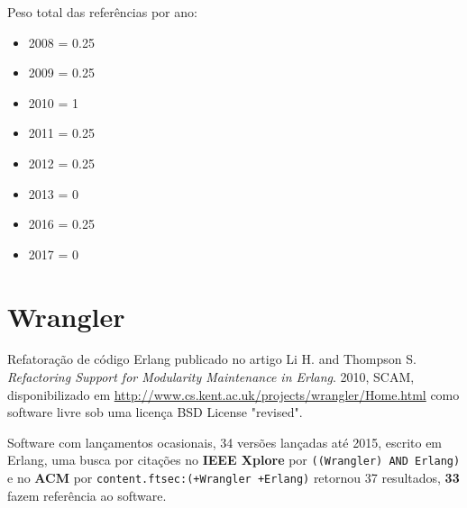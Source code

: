 Peso total das referências por ano:

\begin{itemize}
\item 2008 = 0.25
\item 2009 = 0.25
\item 2010 = 1
\item 2011 = 0.25
\item 2012 = 0.25
\item 2013 = 0
\item 2016 = 0.25
\item 2017 = 0
\end{itemize}


\section{Wrangler}

Refatoração de código Erlang
publicado no artigo
Li H. and Thompson S.
{\it Refactoring Support for Modularity Maintenance in Erlang}.
2010,
SCAM,
disponibilizado em \url{http://www.cs.kent.ac.uk/projects/wrangler/Home.html}
como software livre
sob uma licença BSD License "revised".

Software com lançamentos ocasionais,
34 versões lançadas
até 2015,
escrito em Erlang,
uma busca por citações no {\bf IEEE Xplore} por
\texttt{((Wrangler) AND Erlang)}
e no {\bf ACM} por
\texttt{content.ftsec:(+Wrangler +Erlang)}
retornou
37 resultados,
{\bf 33} fazem referência ao software.

